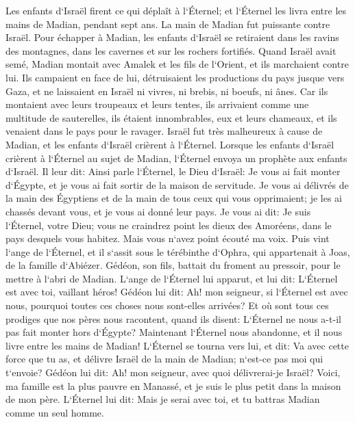 \verse Les enfants d`Israël firent ce qui déplaît à l`Éternel; et l`Éternel les livra entre les mains de Madian, pendant sept ans. 
\verse La main de Madian fut puissante contre Israël. Pour échapper à Madian, les enfants d`Israël se retiraient dans les ravins des montagnes, dans les cavernes et sur les rochers fortifiés. 
\verse Quand Israël avait semé, Madian montait avec Amalek et les fils de l`Orient, et ils marchaient contre lui. 
\verse Ils campaient en face de lui, détruisaient les productions du pays jusque vers Gaza, et ne laissaient en Israël ni vivres, ni brebis, ni boeufs, ni ânes. 
\verse Car ils montaient avec leurs troupeaux et leurs tentes, ils arrivaient comme une multitude de sauterelles, ils étaient innombrables, eux et leurs chameaux, et ils venaient dans le pays pour le ravager. 
\verse Israël fut très malheureux à cause de Madian, et les enfants d`Israël crièrent à l`Éternel. 
\verse Lorsque les enfants d`Israël crièrent à l`Éternel au sujet de Madian, 
\verse l`Éternel envoya un prophète aux enfants d`Israël. Il leur dit: Ainsi parle l`Éternel, le Dieu d`Israël: Je vous ai fait monter d`Égypte, et je vous ai fait sortir de la maison de servitude. 
\verse Je vous ai délivrés de la main des Égyptiens et de la main de tous ceux qui vous opprimaient; je les ai chassés devant vous, et je vous ai donné leur pays. 
\verse Je vous ai dit: Je suis l`Éternel, votre Dieu; vous ne craindrez point les dieux des Amoréens, dans le pays desquels vous habitez. Mais vous n`avez point écouté ma voix. 
\verse Puis vint l`ange de l`Éternel, et il s`assit sous le térébinthe d`Ophra, qui appartenait à Joas, de la famille d`Abiézer. Gédéon, son fils, battait du froment au pressoir, pour le mettre à l`abri de Madian. 
\verse L`ange de l`Éternel lui apparut, et lui dit: L`Éternel est avec toi, vaillant héros! 
\verse Gédéon lui dit: Ah! mon seigneur, si l`Éternel est avec nous, pourquoi toutes ces choses nous sont-elles arrivées? Et où sont tous ces prodiges que nos pères nous racontent, quand ils disent: L`Éternel ne nous a-t-il pas fait monter hors d`Égypte? Maintenant l`Éternel nous abandonne, et il nous livre entre les mains de Madian! 
\verse L`Éternel se tourna vers lui, et dit: Va avec cette force que tu as, et délivre Israël de la main de Madian; n`est-ce pas moi qui t`envoie? 
\verse Gédéon lui dit: Ah! mon seigneur, avec quoi délivrerai-je Israël? Voici, ma famille est la plus pauvre en Manassé, et je suis le plus petit dans la maison de mon père. 
\verse L`Éternel lui dit: Mais je serai avec toi, et tu battras Madian comme un seul homme. 
